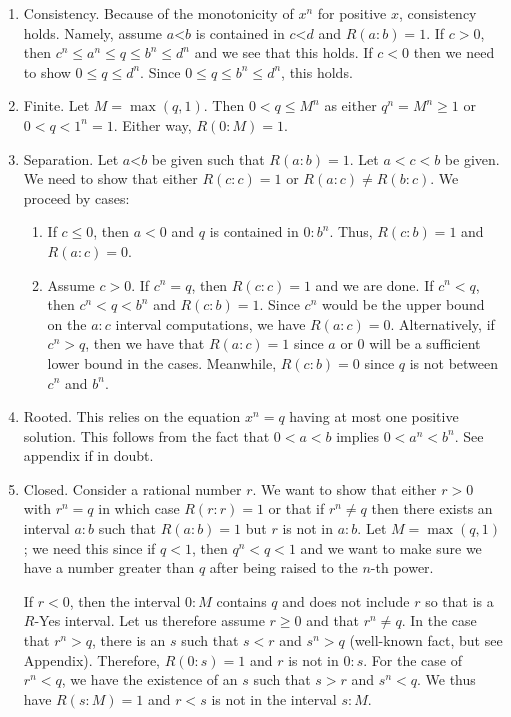 \documentclass[12pt]{article}
\theoremstyle{remark}
\newcommand{\lt}{\mathord{<}}
\begin{document}
\begin{enumerate}
    \item Consistency. Because of the monotonicity of $x^n$ for positive $x$, consistency holds. Namely, assume $a\lt b$ is contained in $c \lt d$ and $R(a:b)=1$. If $c>0$, then $c^n \leq a^n \leq q \leq b^n \leq d^n$ and we see that this holds. If $c<0$ then we need to show $0 \leq q \leq d^n$. Since $0 \leq q \leq  b^n \leq d^n$, this holds. 
    \item Finite. Let $M = \max(q, 1)$. Then $0 < q \leq M^n$ as either $q^n = M^n \geq 1$ or $0 < q < 1^n = 1$. Either way, $R(0:M) = 1$. 
    \item Separation. Let $a\lt b$ be given such that $R(a:b)=1$. Let $a < c <b$ be given. We need to show that either $R(c:c) = 1$ or $R(a:c) \neq R(b:c)$. We proceed by cases:
    \begin{enumerate}
        \item If $c \leq 0$, then $a<0$ and $q$ is contained in $0:b^n$. Thus, $R(c:b) = 1$ and $R(a:c) = 0$. 
        \item Assume $c>0$. If $c^n = q$, then $R(c:c)=1$ and we are done. If $c^n < q$, then $c^n < q< b^n$ and $R(c:b)=1$. Since $c^n$ would be the upper bound on the $a:c$ interval computations, we have $R(a:c)=0$. Alternatively, if $c^n > q$, then we have that $R(a:c)=1$ since $a$ or $0$ will be a sufficient lower bound in the cases. Meanwhile, $R(c:b) = 0$ since $q$ is not between $c^n$ and $b^n$. 
    \end{enumerate}
     \item Rooted. This relies on the equation $x^n = q$ having at most one positive solution. This follows from the fact that $0<a<b$ implies $0 < a^n < b^n$. See appendix if in doubt. 
    \item Closed. Consider a rational number $r$. We want to show that either $r>0$ with $r^n = q$ in which case $R(r:r)=1$ or that if $r^n \neq q$ then there exists an interval $a:b$ such that $R(a:b)=1$ but $r$ is not in $a:b$. Let $M = \max(q, 1)$; we need this since if $q<1$, then $q^n < q < 1$ and we want to make sure we have a number greater than $q$ after being raised to the $n$-th power. 
    
    If $r < 0$, then the interval $0:M$ contains $q$ and does not include $r$ so that is a $R$-Yes interval. Let us therefore assume $r \geq 0$ and that $r^n \neq q$. In the case that $r^n > q$, there is an $s$ such that $s<r$ and $s^n > q$ (well-known fact, but see Appendix). Therefore, $R(0:s) = 1$ and $r$ is not in $0:s$. For the case of $r^n < q$, we have the existence of an $s$ such that $s > r$ and $s^n < q$. We thus have $R(s:M)=1$ and $r < s$ is not in the interval $s:M$. 
    
\end{enumerate}
\end{document}
